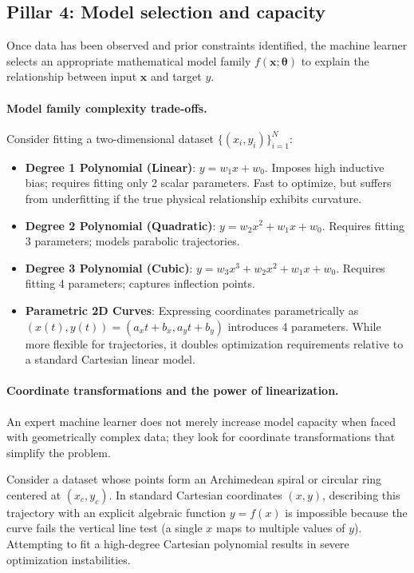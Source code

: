 \subsection{Pillar 4: Model selection and capacity}
\label{sec:pillar_4_model_family}

Once data has been observed and prior constraints identified, the machine learner selects an appropriate mathematical model family $f(\mathbf{x}; \boldsymbol{\theta})$ to explain the relationship between input $\mathbf{x}$ and target $y$.

\paragraph{Model family complexity trade-offs.}
Consider fitting a two-dimensional dataset $\{(x_i, y_i)\}_{i=1}^N$:
\begin{itemize}[noitemsep]
  \item \textbf{Degree 1 Polynomial (Linear)}: $y = w_1 x + w_0$. Imposes high inductive bias; requires fitting only 2 scalar parameters. Fast to optimize, but suffers from underfitting if the true physical relationship exhibits curvature.
  \item \textbf{Degree 2 Polynomial (Quadratic)}: $y = w_2 x^2 + w_1 x + w_0$. Requires fitting 3 parameters; models parabolic trajectories.
  \item \textbf{Degree 3 Polynomial (Cubic)}: $y = w_3 x^3 + w_2 x^2 + w_1 x + w_0$. Requires fitting 4 parameters; captures inflection points.
  \item \textbf{Parametric 2D Curves}: Expressing coordinates parametrically as $(x(t), y(t)) = (a_x t + b_x, a_y t + b_y)$ introduces 4 parameters. While more flexible for trajectories, it doubles optimization requirements relative to a standard Cartesian linear model.
\end{itemize}

\paragraph{Coordinate transformations and the power of linearization.}
An expert machine learner does not merely increase model capacity when faced with geometrically complex data; they look for coordinate transformations that simplify the problem.

Consider a dataset whose points form an Archimedean spiral or circular ring centered at $(x_c, y_c)$. In standard Cartesian coordinates $(x, y)$, describing this trajectory with an explicit algebraic function $y = f(x)$ is impossible because the curve fails the vertical line test (a single $x$ maps to multiple values of $y$). Attempting to fit a high-degree Cartesian polynomial results in severe optimization instabilities.


